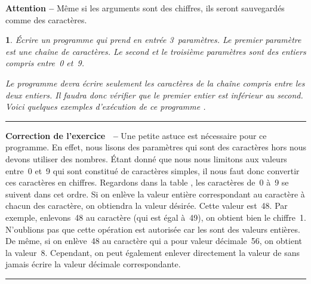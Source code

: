 \documentclass[a4paper]{article}
\newenvironment{Correction}{\par\tiny\blue\rule[1ex]{\textwidth}{1pt}\par\normalsize\textbf{\sffamily{}Correction de l'exercice~\theExo{} -- }}{\par\tiny\blue\rule[1ex]{\textwidth}{1pt}\par}
\newtheorem{Exo}{{\sffamily{Exercice}}}
\begin{document}
		\textbf{Attention -- }Même si les arguments sont des chiffres, ils seront sauvegardés comme des caractères.
		\begin{Exo}
			Écrire un programme qui prend en entrée 3~paramètres.
			Le premier paramètre est une chaîne de caractères.
			Le second et le troisième paramètres sont des entiers compris entre~0 et~9.

			Le programme devra écrire seulement les caractères de la chaîne compris entre les deux entiers.
			Il faudra donc vérifier que le premier entier est inférieur au second.
			Voici quelques exemples d'exécution de ce programme .
		\end{Exo}
		\begin{Correction}
			Une petite astuce est nécessaire pour ce programme.
			En effet, nous lisons des paramètres qui sont des caractères hors nous devons utiliser des nombres.
			Étant donné que nous nous limitons aux valeurs entre~0 et~9 qui sont constitué de caractères simples, il nous faut donc convertir ces caractères en chiffres.
			Regardons dans la table , les caractères de~0 à~9 se suivent dans cet ordre.
			Si on enlève la valeur entière correspondant au caractère  à chacun des caractère, on obtiendra la valeur désirée.
			Cette valeur est~48.
			Par exemple, enlevons~48 au caractère  (qui est égal à~49), on obtient bien le chiffre~1.
			N'oublions pas que cette opération est autorisée car les  sont des valeurs entières.
			De même, si on enlève~48 au caractère  qui a pour valeur décimale~56, on obtient la valeur~8.
			Cependant, on peut également enlever directement la valeur de  sans jamais écrire la valeur décimale correspondante.
		\end{Correction}
\end{document}
